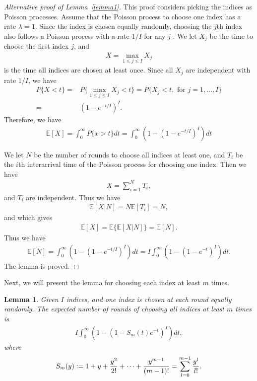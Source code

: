 \documentclass{article}
\newtheorem{lemma}{Lemma}
\begin{document}
\begin{proof}[Alternative proof of Lemma~\ref{lemma1}]
This proof considers picking the indices as Poisson processes. Assume that the Poisson process to choose one index has a rate $\lambda=1$. Since the index is chosen equally randomly, choosing the $j$th index also follows a Poisson process with a rate $1/I$ for any $j$ \citep[Proposition 5.2]{Ross14}. 
We let $X_j$ be the time to choose the first index $j$, and 
\begin{align}
    X=\max_{1\leq j \leq I}X_j
\end{align}
is the time all indices are chosen at least once. 
Since all $X_j$ are independent with rate $1/I$, we have 
\begin{align*}
    P\{X<t\} =& P\{\max\limits_{1\leq j\leq I}X_j<t\} = P\{X_j <t, \mbox{ for } j=1,\dots,I\}\\
    =& (1-e^{-t/I})^I.
\end{align*}
Therefore, we have 
\begin{align*}
    \mathbb{E}[X] =\int_0^\infty P\{x>t\}dt = \int_0^\infty \left(1-(1-e^{-t/I})^I\right)dt
\end{align*}

We let $N$ be the number of rounds to choose all indices at least one, and $T_i$ be the $i$th interarrival time of the Poisson process for choosing one index. Then we have 
\begin{align*}
    X=\sum_{i=1}^NT_i,
\end{align*}
and $T_i$ are independent. Thus we have 
\begin{align*}
    \mathbb{E}[X|N] = N\mathbb{E}[T_i] = N,
\end{align*}
and which gives 
\begin{align*}
    \mathbb{E}[X]=\mathbb{E}\{\mathbb{E}[X|N]\}=\mathbb{E}[N].
\end{align*}
Thus we have 
\begin{align*}
    \mathbb{E}[N]=\int_0^\infty \left(1- (1-e^{-t/I})^I\right)dt= I\int_0^\infty \left(1- (1-e^{-t})^I\right)dt.
\end{align*}
The lemma is proved. 
\end{proof}

Next, we will present the lemma for choosing each index at least $m$ times. 

\vspace{1mm}
\begin{lemma}\label{lemma2} Given $I$ indices, and one index is chosen at each round equally randomly. The expected number of rounds of choosing all indices at least $m$ times is 
\begin{align*}
    I\int_0^\infty \left(1- (1-S_m(t)e^{-t})^I\right)dt,
\end{align*}
where 
\begin{align}
    S_m(y):=1+y+{y^2\over 2!}+\dots+{y^{m-1}\over (m-1)!}=\sum_{l=0}^{m-1}{y^l\over l!}.
\end{align}
\end{lemma}
\end{document}
